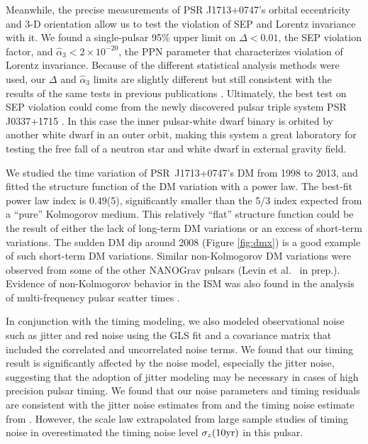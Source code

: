 Meanwhile, the precise measurements of PSR J1713+0747's orbital eccentricity and
3-D orientation allow us to test the violation of SEP and 
Lorentz invariance with it. We found a single-pulsar 95\% upper limit on 
$\Delta <0.01$, the SEP violation factor, and
$\hat{\alpha}_3<2\times10^{-20}$, the PPN parameter that characterizes
violation of Lorentz invariance. 
Because of the different statistical analysis methods were used, our 
$\Delta$ and $\hat{\alpha}_3$ limits  are slightly
different but still consistent with the results of the same tests in previous publications 
\citep{wex00, sns+05, sfl+05, gsf+11}.
Ultimately, the best test on SEP violation could come from the newly
discovered pulsar triple system PSR J0337+1715 \citep{rsa+14, ssa+15, bbc+15}. In this case 
the inner pulsar-white dwarf binary is orbited by another white dwarf in an
outer orbit, making this system a great laboratory for testing
the free fall of a neutron star and white dwarf in external gravity field.

We studied the time variation of PSR~J1713+0747's DM from 1998 to 2013, and
fitted the structure function of the DM variation with a power law.  
The best-fit power law index is 0.49(5), significantly smaller than the 5/3 
index expected from a ``pure'' Kolmogorov medium. This relatively ``flat'' structure
function could be the result of either the lack of long-term DM variations or an
excess of short-term variations. The sudden DM dip around 2008 (Figure
\ref{fig:dmx}) is a good example of such short-term DM variations.
Similar non-Kolmogorov DM variations were observed from some of the
other NANOGrav pulsars (Levin et al. \ in prep.). Evidence of non-Kolmogorov behavior 
in the ISM was also found in the analysis of multi-frequency pulsar scatter times \citep{lkk15}.

In conjunction with the timing modeling, we also modeled observational noise
such as jitter and red noise
 using the GLS fit and a covariance matrix that included the
correlated and uncorrelated noise terms.
We found that our timing result is significantly affected by the noise
model, especially the jitter noise, suggesting that the adoption of jitter
modeling may be necessary in cases of high precision pulsar timing. 
We found that our noise parameters and timing residuals are consistent with the jitter
noise estimates from \citet{sc12} and the timing noise estimate from \citet{sc10}. However,
the scale law extrapolated from large sample studies of timing noise in \citet{hlk10}
overestimated the timing noise level $\sigma_z({\rm 10 yr})$ in this pulsar.

